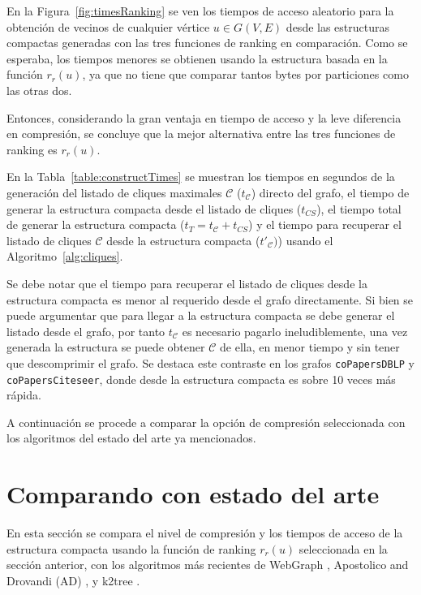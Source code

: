 
%


En la Figura~\ref{fig:timesRanking} se ven los tiempos de acceso aleatorio para la obtención de vecinos de cualquier vértice $u \in G(V, E)$ desde las estructuras compactas generadas con las tres funciones de ranking en comparación. Como se esperaba, los tiempos menores se obtienen usando la estructura basada en la función $r_{r}(u)$, ya que no tiene que comparar tantos bytes por particiones como las otras dos.



Entonces, considerando la gran ventaja en tiempo de acceso y la leve diferencia en compresión, se concluye que la mejor alternativa entre las tres funciones de ranking es $r_{r}(u)$. 

En la Tabla~\ref{table:constructTimes} se muestran los tiempos en segundos de la generación del listado de cliques maximales $\mathcal{C}$ ($t_{\mathcal{C}}$) directo del grafo, el tiempo de generar la estructura compacta desde el listado de cliques ($t_{CS}$), el tiempo total de generar la estructura compacta ($t_{T} = t_{\mathcal{C}} + t_{CS}$) y el tiempo para recuperar el listado de cliques $\mathcal{C}$ desde la estructura compacta ($t'_{\mathcal{C}})$) usando el Algoritmo~\ref{alg:cliques}. 

Se debe notar que el tiempo para recuperar el listado de cliques desde la estructura compacta es menor al requerido desde el grafo directamente. Si bien se puede argumentar que para llegar a la estructura compacta se debe generar el listado desde el grafo, por tanto $t_{\mathcal{C}}$ es necesario pagarlo ineludiblemente, una vez generada la estructura se puede obtener $\mathcal{C}$ de ella, en menor tiempo y sin tener que descomprimir el grafo. Se destaca este contraste en los grafos \texttt{coPapersDBLP} y \texttt{coPapersCiteseer}, donde desde la estructura compacta es sobre 10 veces más rápida.



A continuación se procede a comparar la opción de compresión seleccionada con los algoritmos del estado del arte ya mencionados.




\section{Comparando con estado del arte}
En esta sección se compara el nivel de compresión y los tiempos de acceso de la estructura compacta usando la función de ranking $r_{r}(u)$ seleccionada en la sección anterior, con los algoritmos más recientes de WebGraph \cite{boldi2011layered}, Apostolico and Drovandi (AD) \cite{apostolico2009graph}, y k2tree \cite{brisaboa2014compact}.

